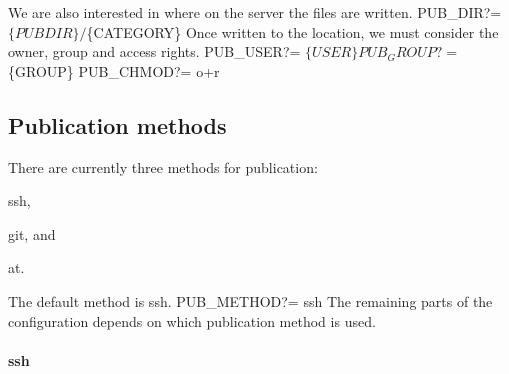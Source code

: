 We are also interested in where on the server the files are written.
\nwenddocs{}\plusendmoddef\nwstartdeflinemarkup{}\nwenddeflinemarkup
PUB_DIR?=           $\{PUBDIR\}/$\{CATEGORY\}
\nwendcode{}Once written to the location, we must consider the owner, group and access 
rights.
\nwenddocs{}\plusendmoddef\nwstartdeflinemarkup{}\nwenddeflinemarkup
PUB_USER?=          $\{USER\}
PUB_GROUP?=         $\{GROUP\}
PUB_CHMOD?=         o+r
\nwendcode{}\nwdocspar

\subsection{Publication methods}

There are currently three methods for publication:
\begin{enumerate*}
\item {\Tt{}ssh\nwendquote},
\item {\Tt{}git\nwendquote}, and
\item {\Tt{}at\nwendquote}.
\end{enumerate*}
The default method is {\Tt{}ssh\nwendquote}.
\nwenddocs{}\plusendmoddef\nwstartdeflinemarkup{}\nwenddeflinemarkup
PUB_METHOD?=        ssh
\nwendcode{}The remaining parts of the configuration depends on which publication method 
is used.

\paragraph{ssh}

